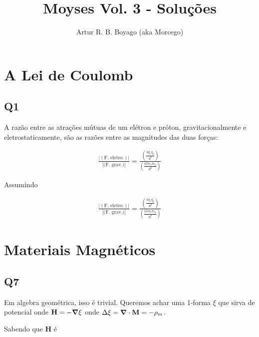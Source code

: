 \documentclass{antiquebook}
\author{Artur R. B. Boyago (aka Morcego)}
\title{{Moyses Vol. 3 - Soluções}}
\begin{document}
	\frontmatter
	\maketitle

	\tableofcontents

	\mainmatter
	\pagestyle{fancy}

	\chapter{A Lei de Coulomb}

	\section{Q1}

	A razão entre as atrações mútuas de um elétron e próton, gravitacionalmente e eletrostaticamente,
	são as razões entre as magnitudes das duas forças:

	\begin{align*}
		\frac{|(\text{F. eletro.})|}{|\text{(F. grav.)}|} = 
		\frac{ \left (  \frac{ k q_e q_p}{d^2} \right )}{\left (  \frac{ G m_e m_p}{d^2} \right )}
	\end{align*}

	Assumindo

	\begin{align*}
		\frac{|(\text{F. eletro.})|}{|\text{(F. grav.)}|} = 
		\frac{ \left (  \frac{ k q_e q_p}{d^2} \right )}{\left (  \frac{ G m_e m_p}{d^2} \right )}
	\end{align*}

	\chapter{Materiais Magnéticos}

	\section{Q7}

	Em algebra geométrica, isso é trivial. Queremos achar uma 1-forma $\xi$
	que sirva de potencial onde $\mathbf{H} = -\grad \xi$ onde
	$\Delta \xi = \grad \cdot \mathbf{M} = -\rho_m$.

	\vspace{\baselineskip}

	Sabendo que $\mathbf{H}$ é
\end{document}
